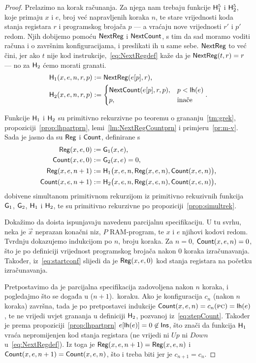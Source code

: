 \begin{proof}
Prelazimo na korak računanja. Za njega nam trebaju funkcije $\mathsf H_1^5$ i $\mathsf H_2^5$, koje primaju $x$ i $e$, broj već napravljenih koraka $n$, te stare vrijednosti koda stanja registara $r$ i programskog brojača $p$ --- a vraćaju nove vrijednosti $r'$ i $p'$ redom. Njih dobijemo pomoću $\mathsf{NextReg}$ i $\mathsf{NextCount}$, s tim da sad moramo voditi računa i o završnim konfiguracijama, i preslikati ih u same sebe. $\mathsf{NextReg}$ to već čini, jer ako $t$ nije kod instrukcije,~\eqref{eq:NextRegdef} kaže da je $\mathsf{NextReg}(t,r)=r$ --- no za $\mathsf H_2$ ćemo morati granati.
\begin{align}
    \mathsf H_1(x,e,n,r,p)&:=\mathsf{NextReg}(e[p],r)\text,\\
    \mathsf H_2(x,e,n,r,p)&:=\begin{cases}
        \mathsf{NextCount}(e[p],r,p),&
        p<\mathsf{lh}(e)\\
        p,&\text{inače}
    \end{cases}\text.
\end{align}

Funkcije $\mathsf H_1$ i $\mathsf H_2$ su primitivno rekurzivne po teoremu o grananju~\ref{tm:grek}, propoziciji~\ref{prop:lhpartprn}, lemi~\ref{lm:NextRegCountprn} i primjeru~\ref{pr:m-v}. Sada je jasno da su $\mathsf{Reg}$ i $\mathsf{Count}$, definirane s
\begin{align}
    \mathsf{Reg}(x,e,0)&:=\mathsf G_1(x,e)\text,\\
    \mathsf{Count}(x,e,0)&:=\mathsf G_2(x,e)=0\text,\\
    \label{eq:stepReg}\mathsf{Reg}(x,e,n+1)&:=\mathsf H_1\bigl(x,e,n,\mathsf{Reg}(x,e,n),\mathsf{Count}(x,e,n)\bigr)\text,\\
    \label{eq:stepCount}\mathsf{Count}(x,e,n+1)&:=\mathsf H_2\bigl(x,e,n,\mathsf{Reg}(x,e,n),\mathsf{Count}(x,e,n)\bigr)\text,
\end{align}
dobivene simultanom primitivnom rekurzijom iz primitivno rekuzivnih funkcija $\mathsf G_1$, $\mathsf G_2$, $\mathsf H_1$ i $\mathsf H_2$, te su primitivno rekurzivne po propoziciji~\ref{prop:simultrek}.

Dokažimo da doista ispunjavaju navedenu parcijalnu specifikaciju. U tu svrhu, neka je $\vec x$ neprazan konačni niz, $P$ RAM-program, te $x$ i $e$ njihovi kodovi redom. Tvrdnju dokazujemo indukcijom po $n$, broju koraka. Za $n=0$, $\mathsf{Count}(x,e,n)=0$, što je po definiciji vrijednost programskog brojača nakon $0$ koraka izračunavanja. Također, iz~\eqref{eq:startconf} slijedi da je $\mathsf{Reg}(x,e,0)$ kod stanja registara na početku izračunavanja.

Pretpostavimo da je parcijalna specifikacija zadovoljena nakon $n$ koraka, i pogledajmo što se događa u ($n+1$).\ koraku. Ako je konfiguracija $c_n$ (nakon $n$ koraka) završna, tada je po pretpostavci indukcije $\mathsf{Count}(x,e,n)=c_n(\textsc{pc})=\mathsf{lh}(e)$, te ne vrijedi uvjet grananja u definiciji $\mathsf H_2$, pozvanoj  iz~\eqref{eq:stepCount}. Također je prema propoziciji~\ref{prop:lhpartprn} $e[\mathsf{lh}(e)]=0\not\in\mathsf{Ins}$, što znači da funkcija $\mathsf H_1$ vraća nepromijenjen kod stanja registara (ne vrijedi ni $Up$ ni $Down$ u~\eqref{eq:NextRegdef}). Iz toga je $\mathsf{Reg}(x,e,n+1)=\mathsf{Reg}(x,e,n)$ i $\mathsf{Count}(x,e,n+1)=\mathsf{Count}(x,e,n)$, što i treba biti jer je $c_{n+1}=c_n$.


\end{proof}
